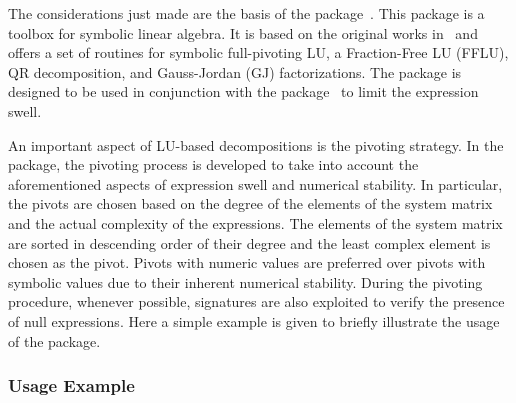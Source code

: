 The considerations just made are the basis of the \LAST{} package~\cite{last}. This package is a \Maple{} toolbox for symbolic linear algebra. It is based on the original works in~\cite{carette2006linear,zhou2008fraction} and offers a set of routines for symbolic full-pivoting LU, a Fraction-Free LU (FFLU), QR decomposition, and Gauss-Jordan (GJ) factorizations. The package \LAST{} is designed to be used in conjunction with the \LEM{} package~\cite{lem} to limit the expression swell.

An important aspect of LU-based decompositions is the pivoting strategy. In the \LAST{} package, the pivoting process is developed to take into account the aforementioned aspects of expression swell and numerical stability. In particular, the pivots are chosen based on the degree of the elements of the system matrix and the actual complexity of the expressions. The elements of the system matrix are sorted in descending order of their degree and the least complex element is chosen as the pivot. Pivots with numeric values are preferred over pivots with symbolic values due to their inherent numerical stability. During the pivoting procedure, whenever possible, signatures are also exploited to verify the presence of null expressions. Here a simple example is given to briefly illustrate the usage of the \LAST{} package.

\subsubsection{Usage Example}


